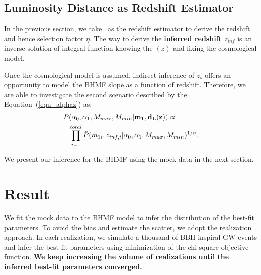 \documentclass[twocolumn]{aastex62}
\newcommand{\blue}[1]{{\bf #1}}
\begin{document}
\subsection{Luminosity Distance as Redshift Estimator} 
\label{sec_dl_z}
In the previous section, we take \dl\ as the redshift estimator to derive the redshift and hence selection factor $\eta$. The way to derive the \textbf{inferred redshift $z_{inf}$} is an inverse solution of integral function knowing the \dl$(z)$ and fixing the cosmological model.

Once the cosmological model is assumed, indirect inference of $z_s$ offers an opportunity to model the BHMF slope as a function of redshift. Therefore, we are able to investigate the second scenario described by the Equation~(\ref{equ_alphaz}) as:
 \begin{equation} \label{equ_lik_alphaz}
 \begin{split}
 P&(\alpha_0, \alpha_1, M_{max}, M_{min}{\bf |m_{1},d_L(z)}) \propto \\
  &\prod_{i=1}^{total} \hat{P}(m_{1i}, z_{inf,i} |\alpha_0, \alpha_1, M_{max}, M_{min})^{1/\eta}.
  \end{split}
 \end{equation}
 
 We present our inference for the BHMF using the mock data in the next section. 


\vspace{1cm}
\section{Result}\label{sec_result}
We fit the mock data to the BHMF model to infer the distribution of the best-fit parameters. To avoid the bias and estimate the scatter, we adopt the realization approach. In each realization, we simulate a thousand of BBH inspiral GW events and infer the best-fit parameters using minimization of the chi-square objective function. \blue{We keep increasing the volume of realizations until the inferred best-fit parameters converged.}
\end{document}
